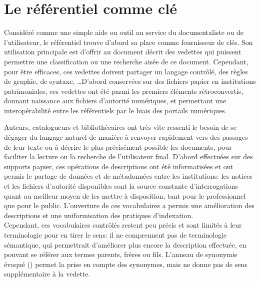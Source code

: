 \chapter{\label{I-A}Le référentiel comme clé}

Considéré comme une simple aide ou outil au service du documentaliste ou de l'utilisateur, le référentiel trouve d'abord sa place comme fournisseur de clés. Son utilisation principale est d'offrir au document décrit des vedettes qui puissent permettre une classification ou une recherche aisée de ce document. Cependant, pour être efficaces, ces vedettes doivent partager un langage contrôlé, des règles de graphie, de syntaxe, \dots D'abord conservées sur des fichiers papier en institutions patrimoniales, ces vedettes ont été parmi les premiers éléments rétroconvertis, donnant naissance aux fichiers d'autorité numériques, et permettant une interopérabilité entre les référentiels par le biais des portails numériques.







\bigskip
\bigskip
\bigskip
Auteurs, catalogueurs et bibliothécaires ont très vite ressenti le besoin de se dégager du langage naturel de manière à renvoyer rapidement vers des passages de leur texte ou à décrire le plus précisément possible les documents, pour faciliter la lecture ou la recherche de l'utilisateur final. D'abord effectuées sur des supports papier, ces opérations de descriptions ont été informatisées et ont permis le partage de données et de métadonnées entre les institutions: les notices et les fichiers d'autorité disponibles sont la source constante d'interrogations quant au meilleur moyen de les mettre à disposition, tant pour le professionnel que pour le public. L'ouverture de ces vocabulaires a permis une amélioration des descriptions et une uniformisation des pratiques d'indexation.\\

Cependant, ces vocabulaires contrôlés restent peu précis et sont limités à leur terminologie pour en tirer le sens: il ne comprennent pas de terminologie sémantique, qui permettrait d'améliorer plus encore la description effectuée, en pouvant se référer aux termes parents, frères ou fils. L'anneau de synonymie évoqué () permet la prise en compte des synonymes, mais ne donne pas de sens supplémentaire à la vedette.